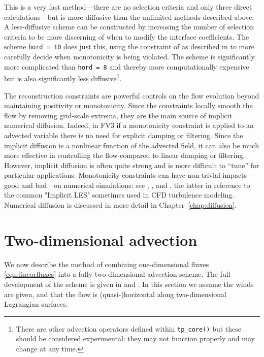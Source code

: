 \documentclass[10pt,letterpaper,margin=1in]{memoir}
\begin{document}
This is a very fast method---there are no selection criteria and only three direct calculations---but is more diffusive than the unlimited methods described above. A less-diffusive scheme can be constructed by increasing the number of selection criteria to be more discerning of when to modify the interface coefficients. The scheme \texttt{hord = 10} does just this, using the constraint of \citet{Huynh1997} as described in \citet{L04} %
to more carefully decide when monotonicity is being violated. The scheme is significantly more complicated than \texttt{hord = 8} and thereby more computationally expensive but is also significantly less diffusive\footnote{There are other advection operators defined within \texttt{tp_core()} but these should be considered experimental: they may not function properly and may change at any time.}.

The reconstruction constraints are powerful controls on the flow evolution beyond maintaining positivity or monotonicity. Since the constraints locally smooth the flow by removing grid-scale extrema, they are the main source of implicit numerical diffusion. Indeed, in FV3 if a monotonicity constraint is applied to an advected variable there is no need for explicit damping or filtering. Since the implicit diffusion is a nonlinear function of the advected field, it can also be much more effective in controlling the flow compared to linear damping or filtering. However, implicit diffusion is often quite strong and is more difficult to ``tune'' for particular applications. Monotonicity constraints can have non-trivial impacts---good and bad---on numerical simulations: see \citet{L04}, \citet{Gao2021}, and \citet{Pressel2017}, the latter in reference to the common "Implicit LES" sometimes used in CFD turbulence modeling.
Numerical diffusion is discussed in more detail in Chapter~\ref{chap:diffusion}. 


\section{Two-dimensional advection} \label{sec:advection2d}

We now describe the method of \citet{LR96} combining one-dimensional fluxes \eqref{eqn:linearfluxes} into a fully two-dimensional advection scheme. The full development of the scheme is given in \citet{PL07} and \citet{LR96}.
In this section we assume the winds are given, and that the flow is (quasi-)horizontal along two-dimensional Lagrangian surfaces. 
\end{document}
